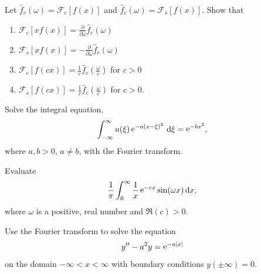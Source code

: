 {\begin{Exercise}
\end{Exercise}





\begin{Exercise}
  \label{exercise ode ft xf(x) f(cx)}
  Let $\hat{f}_c(\omega) = \mathcal{F}_c[f(x)]$ and 
  $\hat{f}_c(\omega) = \mathcal{F}_s[f(x)]$.
  Show that
  \begin{enumerate}
  \item $\mathcal{F}_c[x f(x)] = \frac{\partial}{\partial \omega} \hat{f}_c(\omega)$
  \item $\mathcal{F}_s[x f(x)] = - \frac{\partial}{\partial \omega} \hat{f}_c(\omega)$
  \item $\mathcal{F}_c[f(c x)] = \frac{1}{c} \hat{f}_c\left(\frac{\omega}{c}\right)$
    for $c > 0$
  \item $\mathcal{F}_s[f(c x)] = \frac{1}{c} \hat{f}_c\left(\frac{\omega}{c}\right)$
    for $c > 0$.
  \end{enumerate}

\end{Exercise}




\begin{Exercise}
  \label{exercise ode ft int eqn u eaxxi2}
  Solve the integral equation,
  \[
  \int_{-\infty}^\infty u(\xi) \mathop{\mathrm{e}}\nolimits^{-a (x-\xi)^2} \,\mathrm{d} \xi = \mathop{\mathrm{e}}\nolimits^{-b x^2},
  \]
  where $a,b > 0$, $a \neq b$, with the Fourier transform.

\end{Exercise}



\begin{Exercise}
  \label{exercise ode ft fst e-cx/x}
  Evaluate
  \[
  \frac{1}{\pi} \int_0^\infty \frac{1}{x} \mathop{\mathrm{e}}\nolimits^{- c x} \sin(\omega x) \,\mathrm{d} x,
  \]
  where $\omega$ is a positive, real number and $\Re(c) > 0$.

\end{Exercise}








\begin{Exercise}
  \label{exercise ode ft y-a2y=e-ax}
  Use the Fourier transform to solve the equation
  \[
  y'' - a^2 y = \mathop{\mathrm{e}}\nolimits^{-a |x|}
  \]
  on the domain $-\infty < x < \infty$ with boundary conditions 
  $y(\pm \infty) = 0$.


\end{Exercise}}
